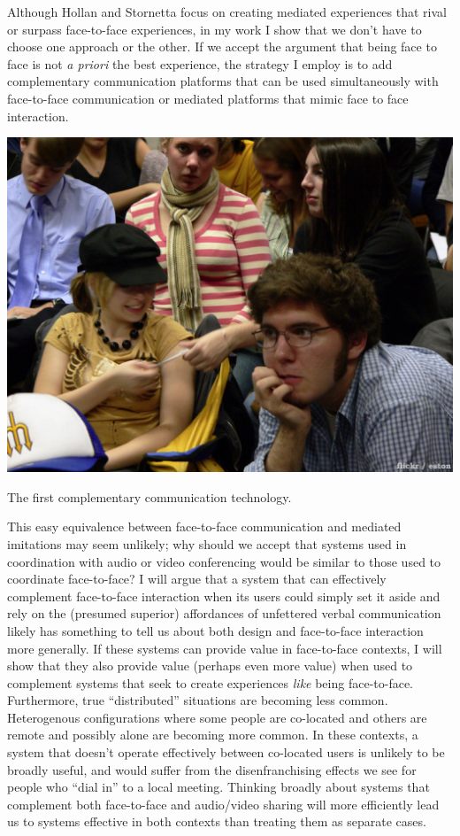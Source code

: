 Although Hollan and Stornetta focus on creating mediated experiences that rival or surpass face-to-face experiences, in my work I show that we don't have to choose one approach or the other. If we accept the argument that being face to face is not \emph{a priori} the best experience, the strategy I employ is to add complementary communication platforms that can be used simultaneously with face-to-face communication or mediated platforms that mimic face to face interaction.


\begin{marginfigure}
	\includegraphics{figures/note-passing.png}
	\caption{The first complementary communication technology.}
	\label{fig:notes}
\end{marginfigure}


This easy equivalence between face-to-face communication and mediated imitations may seem unlikely; why should we accept that systems used in coordination with audio or video conferencing would be similar to those used to coordinate face-to-face? I will argue that a system that can effectively complement face-to-face interaction when its users could simply set it aside and rely on the (presumed superior) affordances of unfettered verbal communication likely has something to tell us about both design and face-to-face interaction more generally. If these systems can provide value in face-to-face contexts, I will show that they also provide value (perhaps even more value) when used to complement systems that seek to create experiences \emph{like} being face-to-face. Furthermore, true ``distributed'' situations are becoming less common. Heterogenous configurations where some people are co-located and others are remote and possibly alone are becoming more common. In these contexts, a system that doesn't operate effectively between co-located users is unlikely to be broadly useful, and would suffer from the disenfranchising effects we see for people who ``dial in'' to a local meeting. Thinking broadly about systems that complement both face-to-face and audio/video sharing will more efficiently lead us to systems effective in both contexts than treating them as separate cases.

